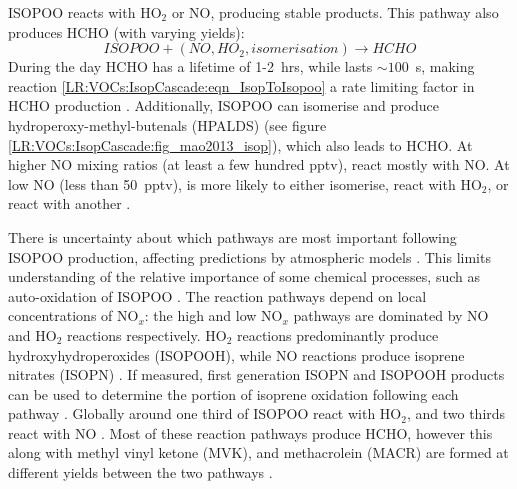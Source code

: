     ISOPOO reacts with HO$_2$ or NO, producing stable products. 
    This pathway also produces HCHO (with varying yields):
    \begin{equation}
      ISOPOO + (NO, HO_2, isomerisation) \rightarrow HCHO 
    \end{equation}
    During the day HCHO has a lifetime of 1-2~hrs, while \roo lasts $\sim 
    100$~s, making reaction \ref{LR:VOCs:IsopCascade:eqn_IsopToIsopoo} a rate 
    limiting factor in HCHO production \parencite{Wolfe2016}.
    Additionally, ISOPOO can isomerise and produce hydroperoxy-methyl-butenals 
    (HPALDS) (see figure \ref{LR:VOCs:IsopCascade:fig_mao2013_isop}), which 
    also leads to HCHO.
    At higher NO mixing ratios (at least a few hundred pptv), \roo react mostly 
    with NO. 
    At low NO (less than 50~pptv), \roo is more likely to either isomerise, 
    react with HO$_2$, or react with another \roo.
      
      
    
    There is uncertainty about which pathways are most important following 
    ISOPOO production, affecting predictions by atmospheric models 
    \parencite{Nguyen2014}.
    This limits understanding of the relative importance of some chemical 
    processes, such as auto-oxidation of ISOPOO \parencite{Crounse2013}.
    The reaction pathways depend on local concentrations of NO$_x$: the high 
    and low NO$_x$ pathways are dominated by NO and HO$_2$ reactions 
    respectively.
    HO$_2$ reactions predominantly produce hydroxyhydroperoxides (ISOPOOH), 
    while NO reactions produce isoprene nitrates (ISOPN) 
    \parencite{Crounse2006}.
    If measured, first generation ISOPN and ISOPOOH products can be used to 
    determine the portion of isoprene oxidation following each pathway 
    \parencite[e.g.,][]{Yu2016}.
    Globally around one third of ISOPOO react with HO$_2$, and two thirds react 
    with NO \parencite{Paulot2009b}.
    Most of these reaction pathways produce HCHO, however this along with 
    methyl vinyl ketone (MVK), and methacrolein (MACR) are formed at different 
    yields between the two pathways \parencite{Marais2012, Liu2016a, Wolfe2016}.
    
